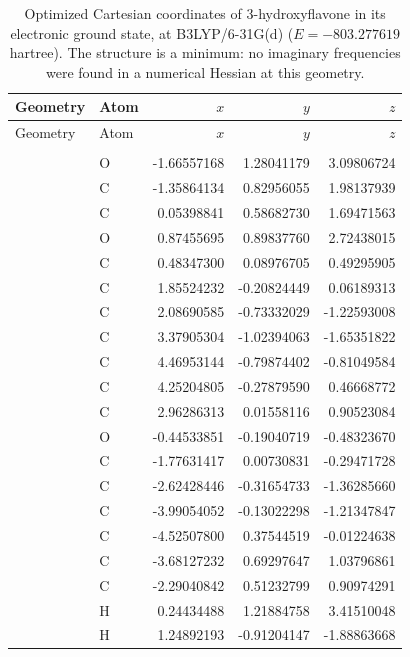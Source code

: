 \begin{longtable}{llrrr}
\caption{
Optimized Cartesian coordinates of 3-hydroxyflavone in its electronic
ground state, at B3LYP/6-31G(d) ($E = -803.277619$ hartree). The
structure is a minimum: no imaginary frequencies were found in a
numerical Hessian at this geometry.
}\label{tab:si_3hf_geometry}\\
\hline
Geometry & Atom & $x$ & $y$ & $z$ \\
\hline
\endfirsthead
\hline
Geometry & Atom & $x$ & $y$ & $z$ \\
\hline
\endhead
\hline
\endfoot
\multicolumn{5}{l}{\textbf{3-Hydroxyflavone, B3LYP/6-31G(d) S$_0$ minimum}}\\
 & O & -1.66557168 &  1.28041179 &  3.09806724 \\
 & C & -1.35864134 &  0.82956055 &  1.98137939 \\
 & C &  0.05398841 &  0.58682730 &  1.69471563 \\
 & O &  0.87455695 &  0.89837760 &  2.72438015 \\
 & C &  0.48347300 &  0.08976705 &  0.49295905 \\
 & C &  1.85524232 & -0.20824449 &  0.06189313 \\
 & C &  2.08690585 & -0.73332029 & -1.22593008 \\
 & C &  3.37905304 & -1.02394063 & -1.65351822 \\
 & C &  4.46953144 & -0.79874402 & -0.81049584 \\
 & C &  4.25204805 & -0.27879590 &  0.46668772 \\
 & C &  2.96286313 &  0.01558116 &  0.90523084 \\
 & O & -0.44533851 & -0.19040719 & -0.48323670 \\
 & C & -1.77631417 &  0.00730831 & -0.29471728 \\
 & C & -2.62428446 & -0.31654733 & -1.36285660 \\
 & C & -3.99054052 & -0.13022298 & -1.21347847 \\
 & C & -4.52507800 &  0.37544519 & -0.01224638 \\
 & C & -3.68127232 &  0.69297647 &  1.03796861 \\
 & C & -2.29040842 &  0.51232799 &  0.90974291 \\
 & H &  0.24434488 &  1.21884758 &  3.41510048 \\
 & H &  1.24892193 & -0.91204147 & -1.88863668 \\

\end{longtable}
